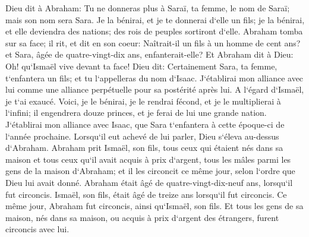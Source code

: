 \verse Dieu dit à Abraham: Tu ne donneras plus à Saraï, ta femme, le nom de Saraï; mais son nom sera Sara. 
\verse Je la bénirai, et je te donnerai d`elle un fils; je la bénirai, et elle deviendra des nations; des rois de peuples sortiront d`elle. 
\verse Abraham tomba sur sa face; il rit, et dit en son coeur: Naîtrait-il un fils à un homme de cent ans? et Sara, âgée de quatre-vingt-dix ans, enfanterait-elle? 
\verse Et Abraham dit à Dieu: Oh! qu`Ismaël vive devant ta face! 
\verse Dieu dit: Certainement Sara, ta femme, t`enfantera un fils; et tu l`appelleras du nom d`Isaac. J`établirai mon alliance avec lui comme une alliance perpétuelle pour sa postérité après lui. 
\verse A l`égard d`Ismaël, je t`ai exaucé. Voici, je le bénirai, je le rendrai fécond, et je le multiplierai à l`infini; il engendrera douze princes, et je ferai de lui une grande nation. 
\verse J`établirai mon alliance avec Isaac, que Sara t`enfantera à cette époque-ci de l`année prochaine. 
\verse Lorsqu`il eut achevé de lui parler, Dieu s`éleva au-dessus d`Abraham. 
\verse Abraham prit Ismaël, son fils, tous ceux qui étaient nés dans sa maison et tous ceux qu`il avait acquis à prix d`argent, tous les mâles parmi les gens de la maison d`Abraham; et il les circoncit ce même jour, selon l`ordre que Dieu lui avait donné. 
\verse Abraham était âgé de quatre-vingt-dix-neuf ans, lorsqu`il fut circoncis. 
\verse Ismaël, son fils, était âgé de treize ans lorsqu`il fut circoncis. 
\verse Ce même jour, Abraham fut circoncis, ainsi qu`Ismaël, son fils. 
\verse Et tous les gens de sa maison, nés dans sa maison, ou acquis à prix d`argent des étrangers, furent circoncis avec lui. 


